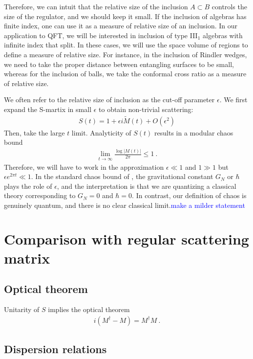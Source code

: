 \documentclass[a4paper,11pt]{article}
\theoremstyle{definition}
\newcommand{\ep}{\epsilon}
\newcommand{\NL}[1]{\textcolor{blue}{#1}}
\begin{document}
Therefore, we can intuit that the relative size of the inclusion $A\subset B$ controls the size of the regulator, and we should keep it small.   
If the inclusion of algebras has finite index, one can use it as a measure of relative size of an inclusion. In our application to QFT, we will be interested in inclusion of type III$_1$ algebras with infinite index that split. In these cases, we will use the space volume of regions to define a measure of relative size. For instance, in the inclusion of Rindler wedges, we need to take the proper distance between entangling surfaces to be small, whereas for the inclusion of balls, we take the conformal cross ratio as a measure of relative size.

We often refer to the relative size of inclusion as the cut-off parameter $\ep$. We first expand the S-martix in small $\ep$ to obtain non-trivial scattering:
\begin{eqnarray}
S(t)=1+\ep i \tilde{M}(t)+O(\ep^2)
\end{eqnarray}
Then, take the large $t$ limit. Analyticity of $S(t)$ results in a modular chaos bound 
\begin{eqnarray}
\lim_{t\to \infty}\frac{\log |M(t)|}{2\pi}\leq 1\ .
\end{eqnarray}
Therefore, we will have to work in the approximation $\ep\ll 1$ and $1\gg 1$ but $\ep e^{2\pi t}\ll 1$. In the standard chaos bound of \cite{}, the gravitational constant $G_N$ or $\hbar$ plays the role of $\ep$, and the interpretation is that we are quantizing a classical theory corresponding to $G_N=0$ and $\hbar=0$. In contrast, our definition of chaos is genuinely quantum, and there is no clear classical limit.\NL{make a milder statement}


\section{Comparison with regular scattering matrix}




\subsection{Optical theorem}

Unitarity of $S$ implies the optical theorem 
\begin{eqnarray}
i (M^\dagger- M)=M^\dagger M\ .
\end{eqnarray}


\subsection{Dispersion relations}
\end{document}

